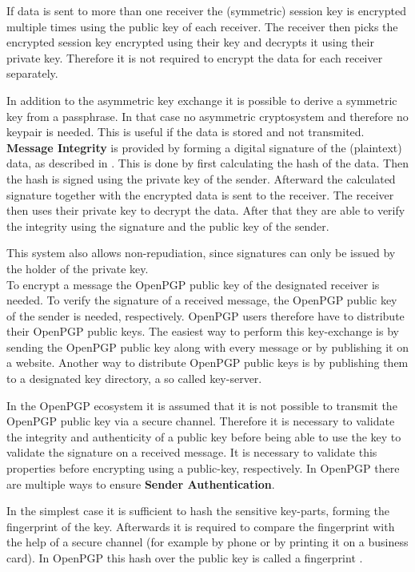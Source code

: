 If data is sent to more than one receiver the (symmetric) session key is encrypted  multiple times using the public key of each receiver. The receiver then picks the encrypted session key encrypted using their key and decrypts it using their private key. Therefore it is not required to encrypt the data for each receiver separately.

In addition to the asymmetric key exchange it is possible to derive a symmetric key from a passphrase. In that case no asymmetric cryptosystem and therefore no keypair is needed. This is useful if the data is stored and not transmited.\\

\textbf{Message Integrity} is provided by forming a digital signature of the (plaintext) data, as described in \cite[section 2.2]{RFC4880}. This is done by first calculating the hash of the data. Then the hash is signed using the private key of the sender. Afterward the calculated signature together with the encrypted data is sent to the receiver. The receiver then uses their private key to decrypt the data. After that they are able to verify the integrity using the signature and the public key of the sender.

This system also allows non-repudiation, since signatures can only be issued by the holder of the private key.\\


To encrypt a message the OpenPGP public key of the designated receiver is needed. To verify the signature of a received message, the OpenPGP public key of the sender is needed, respectively. OpenPGP users therefore have to distribute their OpenPGP public keys. The easiest way to perform this key-exchange is by sending the OpenPGP public key along with every message or by publishing it on a website. Another way to distribute OpenPGP public keys is by publishing them to a designated key directory, a so called key-server.


In the OpenPGP ecosystem it is assumed that it is not possible to transmit the OpenPGP public key via a secure channel. Therefore it is necessary to validate the integrity and authenticity of a public key before being able to use the key to validate the signature on a received message. It is necessary to validate this properties before encrypting using a public-key, respectively. In OpenPGP there are multiple ways to ensure \textbf{Sender Authentication}.

In the simplest case it is sufficient to hash the sensitive key-parts, forming the fingerprint of the key. Afterwards it is required to compare the fingerprint with the help of a secure channel (for example by phone or by printing it on a business card). In OpenPGP this hash over the public key is called a fingerprint \cite[section 12]{RFC4880}.


